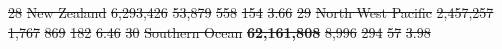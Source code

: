 \documentclass[12pt,authoryear]{elsarticle}
\providecommand{\DIFdeltex}[1]{{\protect\color{red}\sout{#1}}}                      %
\providecommand{\DIFdelFL}[1]{\DIFdel{#1}} %
\providecommand{\DIFaddbeginFL}{} %
\providecommand{\DIFdelendFL}{} %
\providecommand{\DIFdel}[1]{\texorpdfstring{\DIFdeltex{#1}}{}} %
\begin{document}
\begin{table}[]
\DIFdelFL{28 }%
\DIFdelFL{New Zealand                         }%
\DIFdelFL{6,293,426 }%
\DIFdelFL{53,879 }%
\DIFdelFL{558 }%
\DIFdelFL{154 }%
\DIFdelFL{3.66 }%
\DIFdelFL{29 }%
\DIFdelFL{North West Pacific                  }%
\DIFdelFL{2,457,257 }%
\DIFdelFL{1,767 }%
\DIFdelFL{869 }%
\DIFdelFL{182 }%
\DIFdelFL{6.46 }%
\DIFdelFL{30 }%
\DIFdelFL{Southern Ocean                      }%
\textbf{\DIFdelFL{62,161,808}} %
\DIFdelFL{8,996 }%
\DIFdelFL{294 }%
\DIFdelFL{57 }%
\DIFdelFL{3.98 }%
\DIFdelendFL \DIFaddbeginFL 


\end{table}
\end{document}
